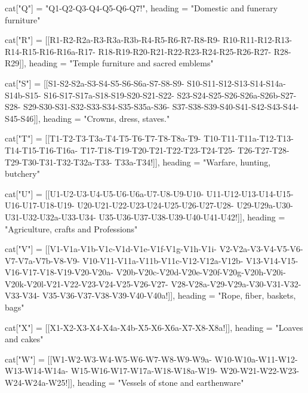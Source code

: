 cat["Q"]   =   {"Q1-Q2-Q3-Q4-Q5-Q6-Q7!",
                heading = "Domestic and funerary furniture"}

cat["R"]  =   {[[R1-R2-R2a-R3-R3a-R3b-R4-R5-R6-R7-R8-R9-
                  R10-R11-R12-R13-R14-R15-R16-R16a-R17-
                  R18-R19-R20-R21-R22-R23-R24-R25-R26-R27-
                  R28-R29]],
                  heading = "Temple furniture and sacred emblems"}

cat["S"]   =   {[[S1-S2-S2a-S3-S4-S5-S6-S6a-S7-S8-S9-
                 S10-S11-S12-S13-S14-S14a-S14b-S15-
                 S16-S17-S17a-S18-S19-S20-S21-S22-
                 S23-S24-S25-S26-S26a-S26b-S27-S28-
                 S29-S30-S31-S32-S33-S34-S35-S35a-S36-
                 S37-S38-S39-S40-S41-S42-S43-S44-S45-S46]],
                heading = "Crowns, dress, staves."}

cat["T"]   =   {[[T1-T2-T3-T3a-T4-T5-T6-T7-T8-T8a-T9-
                 T10-T11-T11a-T12-T13-T14-T15-T16-T16a-
                 T17-T18-T19-T20-T21-T22-T23-T24-T25-
                 T26-T27-T28-T29-T30-T31-T32-T32a-T33-
                 T33a-T34!]],
heading    =     "Warfare, hunting, butchery"}

cat["U"]   =    {[[U1-U2-U3-U4-U5-U6-U6a-U7-U8-U9-U10-
                  U11-U12-U13-U14-U15-U16-U17-U18-U19-
                  U20-U21-U22-U23-U24-U25-U26-U27-U28-
                  U29-U29a-U30-U31-U32-U32a-U33-U34-
                  U35-U36-U37-U38-U39-U40-U41-U42!]],
                  heading = "Agriculture, crafts and Professions"}

cat["V"]   =    {[[V1-V1a-V1b-V1c-V1d-V1e-V1f-V1g-V1h-V1i-
                  V2-V2a-V3-V4-V5-V6-V7-V7a-V7b-V8-V9-
                  V10-V11-V11a-V11b-V11c-V12-V12a-V12b-
                  V13-V14-V15-V16-V17-V18-V19-V20-V20a-
                  V20b-V20c-V20d-V20e-V20f-V20g-V20h-V20i-
                  V20k-V20l-V21-V22-V23-V24-V25-V26-V27-
                  V28-V28a-V29-V29a-V30-V31-V32-V33-V34-
                  V35-V36-V37-V38-V39-V40-V40a!]],
                  heading = "Rope, fiber, baskets, bags"}

cat["X"]   =    {[[X1-X2-X3-X4-X4a-X4b-X5-X6-X6a-X7-X8-X8a!]],
                   heading = "Loaves and cakes"}

cat["W"]   =     {[[W1-W2-W3-W4-W5-W6-W7-W8-W9-W9a-
                    W10-W10a-W11-W12-W13-W14-W14a-
                    W15-W16-W17-W17a-W18-W18a-W19-
                    W20-W21-W22-W23-W24-W24a-W25!]],
                    heading = "Vessels of stone and earthenware"}

